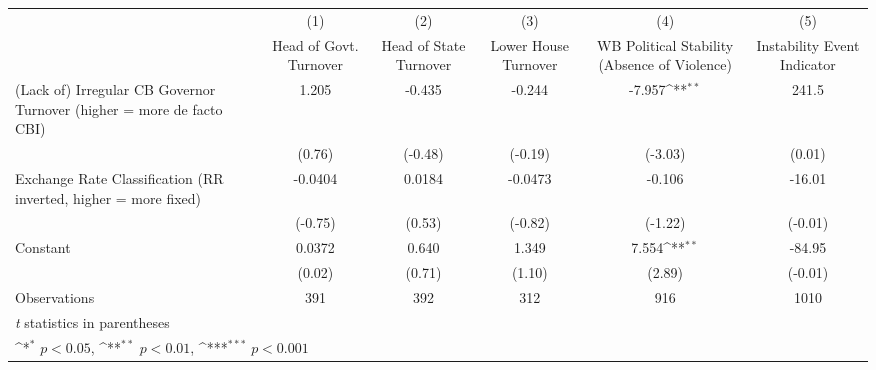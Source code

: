 {
\def\sym#1{\ifmmode^{#1}\else\(^{#1}\)\fi}
\begin{tabular*}{\linewidth}{@{\hskip\tabcolsep\extracolsep\fill}l*{5}{c}}
\toprule
                &\multicolumn{1}{c}{(1)}&\multicolumn{1}{c}{(2)}&\multicolumn{1}{c}{(3)}&\multicolumn{1}{c}{(4)}&\multicolumn{1}{c}{(5)}\\
                &\multicolumn{1}{c}{Head of Govt. Turnover}&\multicolumn{1}{c}{Head of State Turnover}&\multicolumn{1}{c}{Lower House Turnover}&\multicolumn{1}{c}{WB Political Stability (Absence of Violence)}&\multicolumn{1}{c}{Instability Event Indicator}\\
\midrule
(Lack of) Irregular CB Governor Turnover (higher = more de facto CBI)&    1.205         &   -0.435         &   -0.244         &   -7.957\sym{**} &    241.5         \\
                &   (0.76)         &  (-0.48)         &  (-0.19)         &  (-3.03)         &   (0.01)         \\
\addlinespace
Exchange Rate Classification (RR inverted, higher = more fixed)&  -0.0404         &   0.0184         &  -0.0473         &   -0.106         &   -16.01         \\
                &  (-0.75)         &   (0.53)         &  (-0.82)         &  (-1.22)         &  (-0.01)         \\
\addlinespace
Constant        &   0.0372         &    0.640         &    1.349         &    7.554\sym{**} &   -84.95         \\
                &   (0.02)         &   (0.71)         &   (1.10)         &   (2.89)         &  (-0.01)         \\
\midrule
Observations    &      391         &      392         &      312         &      916         &     1010         \\
\bottomrule
\multicolumn{6}{l}{\footnotesize \textit{t} statistics in parentheses}\\
\multicolumn{6}{l}{\footnotesize \sym{*} \(p<0.05\), \sym{**} \(p<0.01\), \sym{***} \(p<0.001\)}\\
\end{tabular*}
}
